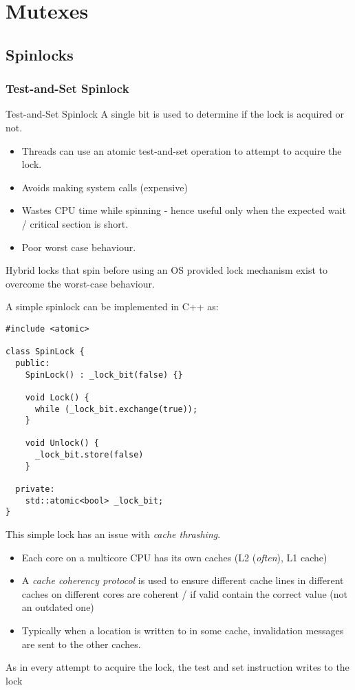 \chapter{Mutexes}

\section{Spinlocks}
\subsection{Test-and-Set Spinlock}
\begin{definitionbox}{Test-and-Set Spinlock}
	A single bit is used to determine if the lock is acquired or not.
	\begin{itemize}
		\item Threads can use an atomic test-and-set operation to attempt to acquire the lock.
		\item Avoids making system calls (expensive)
		\item Wastes CPU time while spinning - hence useful only when the expected wait / critical section is short.
		\item Poor worst case behaviour.
	\end{itemize}
	Hybrid locks that spin before using an OS provided lock mechanism exist to overcome the worst-case behaviour.
\end{definitionbox}

A simple spinlock can be implemented in C++ as:
\begin{verbatim}
#include <atomic>

class SpinLock {
  public:
    SpinLock() : _lock_bit(false) {}

    void Lock() {
      while (_lock_bit.exchange(true));
    }

    void Unlock() {
      _lock_bit.store(false)
    }
  
  private:
    std::atomic<bool> _lock_bit;
}
\end{verbatim}
This simple lock has an issue with \textit{cache thrashing}.
\begin{itemize}
	\item Each core on a multicore CPU has its own caches (L2 (\textit{often}), L1 cache)
	\item A \textit{cache coherency protocol} is used to ensure different cache lines in different caches on different cores are coherent / if valid contain the correct value (not an outdated one)
	\item Typically when a location is written to in some cache, invalidation messages are sent to the other caches.
\end{itemize}
As in every attempt to acquire the lock, the test and set instruction writes to the lock

